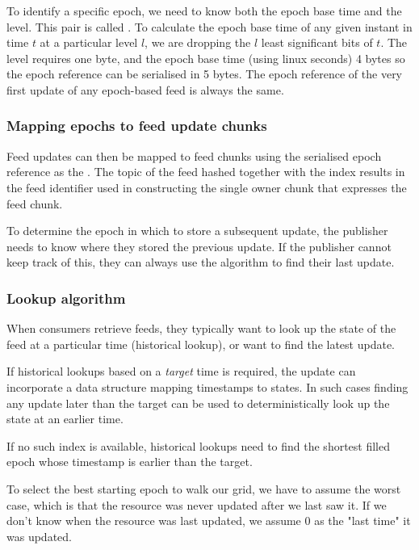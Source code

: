 To identify a specific epoch, we need to know both the epoch base time and the level. This pair is called . To calculate the epoch base time of any given instant in time $t$ at a particular level $l$, we are dropping the $l$ least significant bits of $t$. 
The level requires one byte, and the epoch base time (using linux seconds)  4 bytes so the epoch reference can be serialised in 5 bytes. 
The epoch reference of the very first update of any epoch-based feed is always the same.

\subsubsection{Mapping epochs to feed update chunks}

Feed updates can then be mapped to feed chunks using the serialised epoch reference as the . The topic of the feed hashed together with the index results in the feed identifier used in constructing the single owner chunk that expresses the feed chunk. 

To determine the epoch in which to store a subsequent update, the publisher needs to know where they stored the previous update. If the publisher cannot keep track of this, they can always use the algorithm to find their last update.



\subsubsection{Lookup algorithm}

When consumers retrieve feeds, they typically want to look up the state of the feed at a particular time (historical lookup), or want to find the latest update.

If historical lookups based on a \emph{target} time is required, the update can incorporate a data structure mapping timestamps to states. In such cases finding any update later than the target can be used to deterministically look up the state at an earlier time. 

If no such index is available, historical lookups need to find the shortest filled epoch whose timestamp is earlier than the target. 


To select the best starting epoch to walk our grid, we have to assume the worst case, which is that the resource was never updated after we last saw it. If we don't know when the resource was last updated, we assume 0 as the "last time" it was updated.

